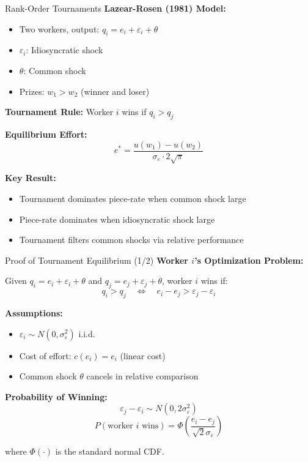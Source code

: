 \documentclass[xcolor={x11names}, aspectratio=169 ]{beamer}
\begin{document}
\begin{frame}{Rank-Order Tournaments}
\textbf{Lazear-Rosen (1981) Model:}
\begin{itemize}
  \item Two workers, output: $q_i = e_i + \varepsilon_i + \theta$
  \item $\varepsilon_i$: Idiosyncratic shock
  \item $\theta$: Common shock
  \item Prizes: $w_1 > w_2$ (winner and loser)
\end{itemize}

\textbf{Tournament Rule:} Worker $i$ wins if $q_i > q_j$

\textbf{Equilibrium Effort:}
$$e^* = \frac{u(w_1) - u(w_2)}{\sigma_\varepsilon \cdot 2\sqrt{\pi}}$$

\textbf{Key Result:}
\begin{itemize}
  \item Tournament dominates piece-rate when common shock large
  \item Piece-rate dominates when idiosyncratic shock large
  \item Tournament filters common shocks via relative performance
\end{itemize}
\end{frame}

\begin{frame}{Proof of Tournament Equilibrium (1/2)}
\textbf{Worker $i$'s Optimization Problem:}

Given $q_i = e_i + \varepsilon_i + \theta$ and $q_j = e_j + \varepsilon_j + \theta$, worker $i$ wins if:
$$q_i > q_j \quad \Leftrightarrow \quad e_i - e_j > \varepsilon_j - \varepsilon_i$$

\textbf{Assumptions:}
\begin{itemize}
  \item $\varepsilon_i \sim N(0, \sigma_\varepsilon^2)$ i.i.d.
  \item Cost of effort: $c(e_i) = e_i$ (linear cost)
  \item Common shock $\theta$ cancels in relative comparison
\end{itemize}

\textbf{Probability of Winning:}
$$\varepsilon_j - \varepsilon_i \sim N(0, 2\sigma_\varepsilon^2)$$
$$P(\text{worker } i \text{ wins}) = \Phi\left(\frac{e_i - e_j}{\sqrt{2}\sigma_\varepsilon}\right)$$

where $\Phi(\cdot)$ is the standard normal CDF.
\end{frame}
\end{document}
